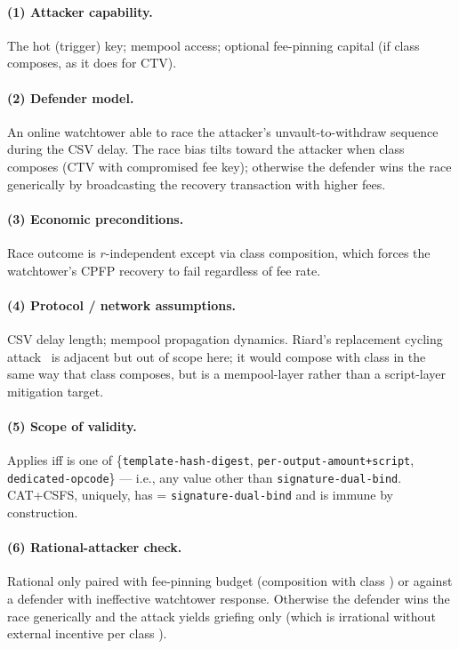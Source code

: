 \paragraph{(1) Attacker capability.}
The hot (trigger) key; mempool access; optional fee-pinning capital
(if class \classfee{} composes, as it does for CTV).

\paragraph{(2) Defender model.}
An online watchtower able to race the attacker's unvault-to-withdraw
sequence during the CSV delay. The race bias tilts toward the
attacker when class \classfee{} composes (CTV with compromised fee
key); otherwise the defender wins the race generically by
broadcasting the recovery transaction with higher fees.

\paragraph{(3) Economic preconditions.}
Race outcome is $r$-independent except via class \classfee{}
composition, which forces the watchtower's CPFP recovery to fail
regardless of fee rate.

\paragraph{(4) Protocol / network assumptions.}
CSV delay length; mempool propagation dynamics. Riard's replacement
cycling attack~\cite{Ria23} is adjacent but out of scope here; it
would compose with class \classhot{} in the same way that class
\classfee{} composes, but is a mempool-layer rather than a
script-layer mitigation target.

\paragraph{(5) Scope of validity.}
Applies iff \axwdbind{} is one of
\{\texttt{template-hash-digest}, \texttt{per-output-amount+script},
\texttt{dedicated-opcode}\} --- i.e., any value other than
\texttt{signature-dual-bind}. CAT+CSFS, uniquely, has \axwdbind{} =
\texttt{signature-dual-bind} and is immune by construction.

\paragraph{(6) Rational-attacker check.}
Rational only paired with fee-pinning budget (composition with
class \classfee{}) or against a defender with ineffective watchtower
response. Otherwise the defender wins the race generically and the
attack yields griefing only (which is irrational without external
incentive per class \classgrief{}).


